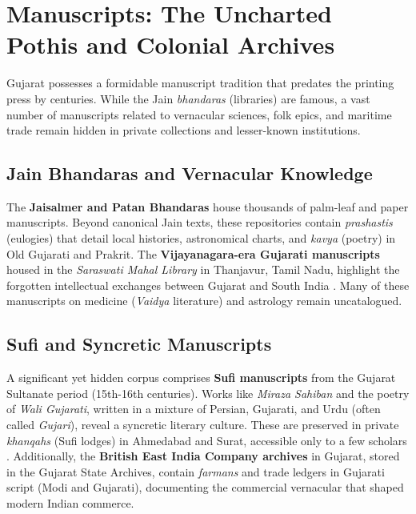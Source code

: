 \documentclass[12pt]{article}
\begin{document}
\begin{center}
\end{center}

\section{Manuscripts: The Uncharted Pothis and Colonial Archives}
Gujarat possesses a formidable manuscript tradition that predates the printing press by centuries. While the Jain \textit{bhandaras} (libraries) are famous, a vast number of manuscripts related to vernacular sciences, folk epics, and maritime trade remain hidden in private collections and lesser-known institutions.

\subsection{Jain Bhandaras and Vernacular Knowledge}
The \textbf{Jaisalmer and Patan Bhandaras} house thousands of palm-leaf and paper manuscripts. Beyond canonical Jain texts, these repositories contain \textit{prashastis} (eulogies) that detail local histories, astronomical charts, and \textit{kavya} (poetry) in Old Gujarati and Prakrit. The \textbf{Vijayanagara-era Gujarati manuscripts} housed in the \textit{Saraswati Mahal Library} in Thanjavur, Tamil Nadu, highlight the forgotten intellectual exchanges between Gujarat and South India \cite{desai2019}. Many of these manuscripts on medicine (\textit{Vaidya} literature) and astrology remain uncatalogued.

\subsection{Sufi and Syncretic Manuscripts}
A significant yet hidden corpus comprises \textbf{Sufi manuscripts} from the Gujarat Sultanate period (15th-16th centuries). Works like \textit{Miraza Sahiban} and the poetry of \textit{Wali Gujarati}, written in a mixture of Persian, Gujarati, and Urdu (often called \textit{Gujari}), reveal a syncretic literary culture. These are preserved in private \textit{khanqahs} (Sufi lodges) in Ahmedabad and Surat, accessible only to a few scholars \cite{mehta2014}. Additionally, the \textbf{British East India Company archives} in Gujarat, stored in the Gujarat State Archives, contain \textit{farmans} and trade ledgers in Gujarati script (Modi and Gujarati), documenting the commercial vernacular that shaped modern Indian commerce.
\end{document}
